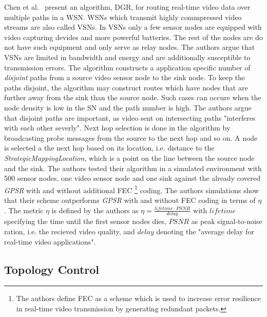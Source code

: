 Chen et al.~\cite{chen2011itinerary} present an algorithm, \ac{DGR}, for
routing real-time video data over multiple paths in a \ac{WSN}. \acp{WSN} which
transmit highly commpressed video streams are also called \acp{VSN}. In
\acp{VSN} only a few sensor nodes are equipped with video capturing devides and
more powerful batteries. The rest of the nodes are do not have such equipment
and only serve as relay nodes. The authors argue that \acp{VSN} are limited in
bandwidth and energy and are additionally susceptible to transmission errors.
The algorithm constructs a application specific number of \textit{disjoint}
paths from a source video sensor node to the sink node. To keep the paths
disjoint, the algorithm may construct routes which have nodes that are further
away from the sink than the source node. Such cases can occure when the node
density is low in the \ac{SN} and the path number is high. The authors argue
that disjoint paths are important, as video sent on intersecting paths
"interferes with each other severly". Next hop selection is done in the
algorithm by broadcasting probe messages from the source to the next hop and so
on. A node is selected a the next hop based on its location, i.e. distance to
the \textit{StrategicMappingLocation}, which is a point on the line between the
source node and the sink. The authors tested their algorithm in a simulated
environment with 500 sensor nodes, one video sensor node and one sink against
the already covered \textit{GPSR} with and without additional \ac{FEC}
\footnote{The authors define \ac{FEC} as a scheme which is used to increase
error resilience in real-time video transmission by generating redundant
packets.} coding. The authors simulations show that their scheme outperforms
\textit{GPSR} with and without \ac{FEC} coding in terms of $ \eta $. The metric
$ \eta $ is defined by the authors as $ \eta = \frac{lifetime \cdot
PSNR}{delay}$ with $ lifetime $ specifying the time until the first sensor
nodes dies, $ PSNR $ as peak signal-to-noise ration, i.e. the recieved video
quality, and $ delay $ denoting the "average delay for real-time video
applications".

\subsection{Topology Control}
\label{sec:Topology Control}

